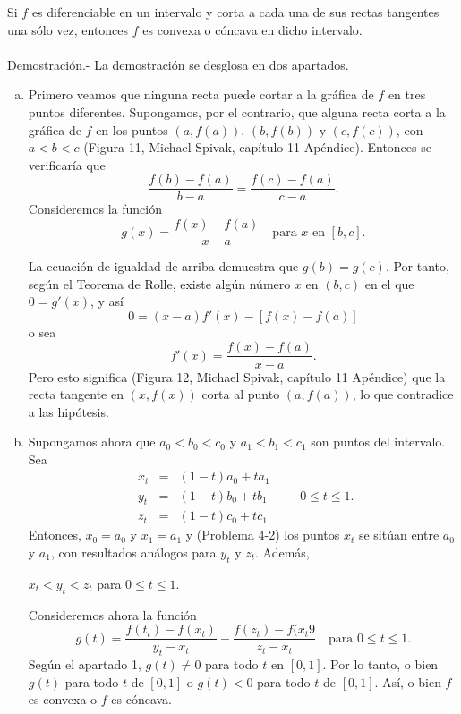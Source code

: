 \begin{teo}
    Si $f$ es diferenciable en un intervalo y corta a cada una de sus rectas tangentes una sólo vez, entonces $f$ es convexa o cóncava en dicho intervalo.\\\\
	Demostración.-\; La demostración se desglosa en dos apartados. 
	\begin{enumerate}[a)]
	    \item Primero veamos que ninguna recta puede cortar a la gráfica de $f$ en tres puntos diferentes. Supongamos, por el contrario, que alguna recta corta a la gráfica de $f$ en los puntos $(a,f(a))$, $(b,f(b))$ y $(c,f(c))$, con $a<b<c$ (Figura 11, Michael Spivak, capítulo 11 Apéndice). Entonces se verificaría que
	    $$\dfrac{f(b)-f(a)}{b-a}=\dfrac{f(c)-f(a)}{c-a}.$$
	    Consideremos la función
	    $$g(x)=\dfrac{f(x)-f(a)}{x-a}\quad \mbox{para } x \mbox{ en }[b,c].$$

	    La ecuación de igualdad de arriba demuestra que $g(b)=g(c)$. Por tanto, según el Teorema de Rolle, existe algún número $x$ en $(b,c)$ en el que $0=g'(x)$, y así
	    $$0=(x-a)f'(x)-[f(x)-f(a)]$$
	    o sea
	    $$f'(x)=\dfrac{f(x)-f(a)}{x-a}.$$
	    Pero esto significa (Figura 12, Michael Spivak, capítulo 11 Apéndice) que la recta tangente en $(x,f(x))$ corta al punto $(a,f(a))$, lo que contradice a las hipótesis.

	    \item Supongamos ahora que $a_0<b_0<c_0$ y $a_1<b_1<c_1$ son puntos del intervalo. Sea
	    $$
	    \begin{array}{rcl}
		x_t &=& (1-t)a_0+ta_1\\
		y_t &=& (1-t)b_0+tb_1\\
		z_t &=& (1-t)c_0+tc_1
	    \end{array}
	    \qquad 
	    0\leq t \leq 1.
	    $$
	    Entonces, $x_0=a_0$ y $x_1=a_1$  y (Problema 4-2) los puntos $x_t$ se sitúan entre $a_0$ y $a_1$, con resultados análogos para $y_t$ y $z_t$. Además,
	    \begin{center}
		$x_t<y_t<z_t$ para $0\leq t \leq 1.$
	    \end{center}
	    Consideremos ahora la función
	    $$g(t)=\dfrac{f(t_t)-f(x_t)}{y_t-x_t}-\dfrac{f(z_t)-f(x_t9}{z_t-x_t}\quad \mbox{para }0\leq t \leq 1.$$
	    Según el apartado 1, $g(t)\neq 0$ para todo $t$ en $[0,1]$. Por lo tanto, o bien $g(t)$ para todo $t$ de $[0,1]$ o $g(t)<0$ para todo $t$ de $[0,1]$. Así, o bien $f$ es convexa o $f$ es cóncava.
	\end{enumerate}
\end{teo}


